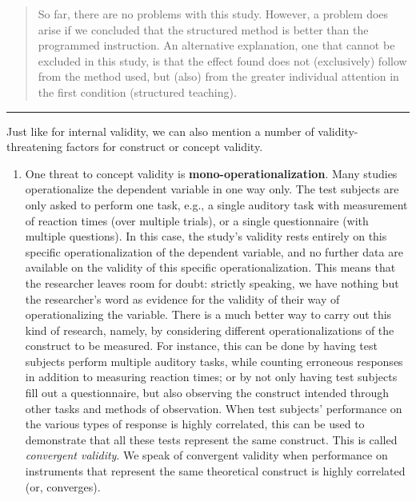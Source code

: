 \documentclass[
]{book}
\providecommand{\tightlist}{%
  \setlength{\itemsep}{0pt}\setlength{\parskip}{0pt}}
\begin{document}
\begin{quote}
So far, there are no problems with this study. However, a problem does arise if we concluded that the structured method is better than the programmed instruction. An alternative explanation, one that cannot be excluded in this study, is that the effect found does not (exclusively) follow from the method used, but (also) from the greater individual attention in the first condition (structured teaching).
\end{quote}

\begin{center}\rule{0.5\linewidth}{0.5pt}\end{center}

Just like for internal validity, we can also mention a number of validity-threatening factors for construct or concept validity.

\begin{enumerate}
\def\labelenumi{\arabic{enumi}.}
\tightlist
\item
  One threat to concept validity is \textbf{mono-operationalization}. Many studies operationalize the dependent variable in one way only. The test subjects are only asked to perform one task, e.g., a single auditory task with measurement of reaction times (over multiple trials), or a single questionnaire (with multiple questions). In this case, the study's validity rests entirely on this specific operationalization of the dependent variable, and no further data are available on the validity of this specific operationalization. This means that the researcher leaves room for doubt: strictly speaking, we have nothing but the researcher's word as evidence for the validity of their way of operationalizing the variable. There is a much better way to carry out this kind of research, namely, by considering different operationalizations of the construct to be measured. For instance, this can be done by having test subjects perform multiple auditory tasks, while counting erroneous responses in addition to measuring reaction times; or by not only having test subjects fill out a questionnaire, but also observing the construct intended through other tasks and methods of observation. When test subjects' performance on the various types of response is highly correlated, this can be used to demonstrate that all these tests represent the same construct. This is called \emph{convergent validity}. We speak of convergent validity when performance on instruments that represent the same theoretical construct is highly correlated (or, converges).
\end{enumerate}
\end{document}
